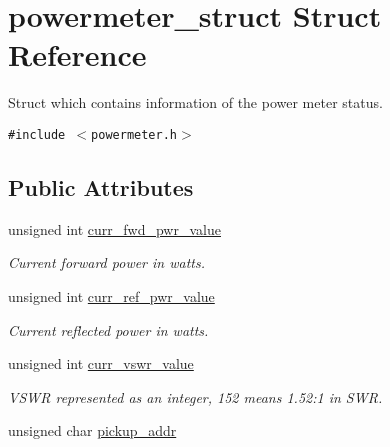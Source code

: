 \hypertarget{structpowermeter__struct}{
\section{powermeter\_\-struct Struct Reference}
\label{structpowermeter__struct}
}
Struct which contains information of the power meter status.  


{\tt \#include $<$powermeter.h$>$}

\subsection*{Public Attributes}
\begin{CompactItemize}
\item 
\hypertarget{structpowermeter__struct_c972f44bcbc194ba15aca9af66953fa3}{
unsigned int \hyperlink{structpowermeter__struct_c972f44bcbc194ba15aca9af66953fa3}{curr\_\-fwd\_\-pwr\_\-value}}
\label{structpowermeter__struct_c972f44bcbc194ba15aca9af66953fa3}

\begin{CompactList}\small\item\em Current forward power in watts. \item\end{CompactList}\item 
\hypertarget{structpowermeter__struct_bb7c2e2ab4d7fd4c660d3cc6724e8441}{
unsigned int \hyperlink{structpowermeter__struct_bb7c2e2ab4d7fd4c660d3cc6724e8441}{curr\_\-ref\_\-pwr\_\-value}}
\label{structpowermeter__struct_bb7c2e2ab4d7fd4c660d3cc6724e8441}

\begin{CompactList}\small\item\em Current reflected power in watts. \item\end{CompactList}\item 
\hypertarget{structpowermeter__struct_80846a697975e5b0e84ffa71ce0690c7}{
unsigned int \hyperlink{structpowermeter__struct_80846a697975e5b0e84ffa71ce0690c7}{curr\_\-vswr\_\-value}}
\label{structpowermeter__struct_80846a697975e5b0e84ffa71ce0690c7}

\begin{CompactList}\small\item\em VSWR represented as an integer, 152 means 1.52:1 in SWR. \item\end{CompactList}\item 
\hypertarget{structpowermeter__struct_0e0388c96a9b5fd759bb43ff22e63e4d}{
unsigned char \hyperlink{structpowermeter__struct_0e0388c96a9b5fd759bb43ff22e63e4d}{pickup\_\-addr}}
\label{structpowermeter__struct_0e0388c96a9b5fd759bb43ff22e63e4d}


\end{CompactItemize}
